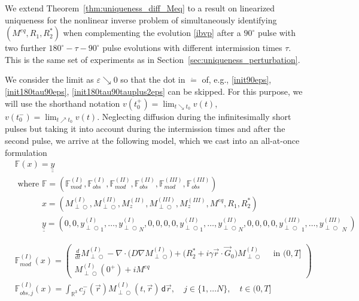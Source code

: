 \documentclass{ws-m3as}
\newcommand{\ul}[1]{\underline{#1}}
\def\Mpp{M_{\perp\!\!\!\!\!\bigcirc}}
\def\yp{y_{\perp\!\!\!\!\!\bigcirc}}
\newcommand\taup{\varepsilon}
\newcommand{\Margin}[1]{}
\begin{document}
\medskip
We extend Theorem~\ref{thm:uniqueness_diff_Meq} to a result on linearized uniqueness for the nonlinear inverse problem of simultaneously identifying $(M^{eq},R_1,R_2^*)$ when complementing the evolution \eqref{ibvp} after a $90^\circ$ pulse with two further $180^\circ-\tau-90^\circ$ pulse evolutions with different intermission times $\tau$. This is the same set of experiments as in Section~\ref{sec:uniqueness_perturbation}.

We consider the limit as $\taup\searrow0$ so that the dot in $\dot{=}$ of, e.g., \eqref{init90eps}, \eqref{init180tau90eps}, \eqref{init180tau90tauplus2eps} can be skipped. For this purpose, we will use the shorthand notation $v(t_0^+)=\lim_{t\searrow t_0}v(t)$, $v(t_0^-)=\lim_{t\nearrow t_0}v(t)$.
Neglecting diffusion during the infinitesimally short pulses but taking it into account during the intermission times and after the second pulse, we arrive at the following model, which we cast into an all-at-once formulation
\[
\begin{aligned}
&\mathbb{F}(x)=\ul{\ul{y}}\\
&\text{ where }\mathbb{F}=(\mathbb{F}^{(I)}_{mod},\mathbb{F}^{(I)}_{obs},\mathbb{F}^{(II)}_{mod},\mathbb{F}^{(II)}_{obs},\mathbb{F}^{(III)}_{mod},\mathbb{F}^{(III)}_{obs})\\
&\phantom{\text{ where }}
x=(\Mpp^{(I)},\Mpp^{(II)},M_z^{(II)},\Mpp^{(III)},M_z^{(III)},M^{eq},R_1,R_2^*)\\
&\phantom{\text{ where }}
\ul{\ul{y}}=(0,0,{\yp^{(I)}}_{\!\!1},\ldots,{\yp^{(I)}}_{\!\!N},0,0,0,0,{\yp^{(II)}}_{\!\!\!\!\!1},\ldots,{\yp^{(II)}}_{\!\!\!\!\!N},0,0,0,0,{\yp^{(III)}}_{\!\!\!\!\!\!\!\!1},\ldots,{\yp^{(III)}}_{\!\!\!\!\!\!\!\!N}\ )
\end{aligned}
\]
\Margin{R2 10)}
\begin{equation}\label{Faao}
\begin{aligned}
&\mathbb{F}^{(I)}_{mod}(x)
=\left(\begin{array}{l}
\frac{d}{dt}\Mpp^{(I)}-\nabla\cdot\bigl(D \nabla \Mpp^{(I)}\bigr) +\bigl(R_2^*+i\gamma\vec r \cdot \vec G_0\bigr)\Mpp^{(I)}
\quad\text{ in }(0,T]\\
\Mpp^{(I)}(0^+)+iM^{eq}
\end{array}\right)
\\
&\mathbb{F}^{(I)}_{obs,j}(x)
=\int_{\mathbb{R}^3} c^-_j(\vec r) \Mpp^{(I)}(t, \vec r) \,\textsf{d}\vec r, \quad j\in\{1,\ldots N\}, \quad t\in(0,T]
\end{aligned}
\end{equation}
\end{document}
